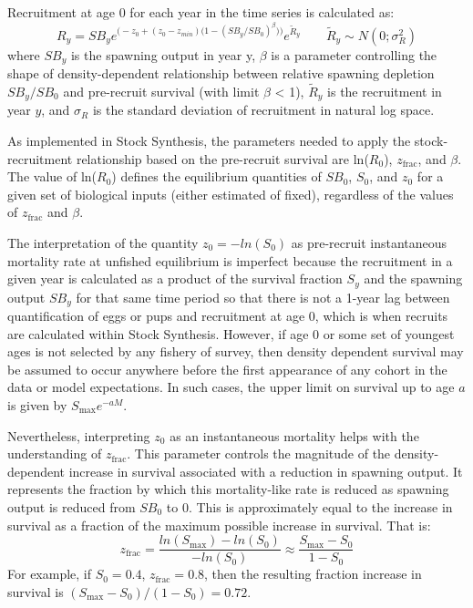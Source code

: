 Recruitment at age 0 for each year in the time series is calculated as:
\begin{equation}{ R_y = SB_ye^{\Big(-z_0 + (z_0-z_{min})\big(1-(SB_y/SB_0)^\beta \big)\Big)}e^{\tilde{R}_y}\qquad  \tilde{R}_y\sim N(0;\sigma^2_R)}
\end{equation}
where $SB_y$ is the spawning output in year y, $\beta$ is a parameter controlling the shape of density-dependent relationship between relative spawning depletion $SB_y/SB_0$ and pre-recruit survival (with limit $\beta$ < 1), $\tilde{R}_y$ is the recruitment in year $y$, and $\sigma_R$ is the standard deviation of recruitment in natural log space. 

As implemented in Stock Synthesis, the parameters needed to apply the stock-recruitment relationship based on the pre-recruit survival are ln($R_0$), $z_{\text{frac}}$, and $\beta$. The value of ln($R_0$) defines the equilibrium quantities of $SB_0$, $S_0$, and $z_0$ for a given set of biological inputs (either estimated of fixed), regardless of the values of $z_{\text{frac}}$ and $\beta$.

The interpretation of the quantity $z_0=-ln(S_0)$ as pre-recruit instantaneous mortality rate at unfished equilibrium is imperfect because the recruitment in a given year is calculated as a product of the survival fraction $S_y$ and the spawning output $SB_y$ for that same time period so that there is not a 1-year lag between quantification of eggs or pups and recruitment at age 0, which is when recruits are calculated within Stock Synthesis. However, if age 0 or some set of youngest ages is not selected by any fishery of survey, then density dependent survival may be assumed to occur anywhere before the first appearance of any cohort in the data or model expectations. In such cases, the upper limit on survival up to age $a$ is given by $S_{\text{max}}e^{-aM}$. 

Nevertheless, interpreting $z_0$ as an instantaneous mortality helps with the understanding of $z_{\text{frac}}$. This parameter controls the magnitude of the density-dependent increase in survival associated with a reduction in spawning output. It represents the fraction by which this mortality-like rate is reduced as spawning output is reduced from $SB_0$ to 0. This is approximately equal to the increase in survival as a fraction of the maximum possible increase in survival. That is: 
\begin{equation}
z_{\text{frac}}=\frac{ln(S_{\text{max}})-ln(S_0)}{-ln(S_0)} \approx \frac{S_{\text{max}}-S_0}{1-S_0}
\end{equation}
For example, if $S_0 = 0.4$, $z_{\text{frac}}=0.8$, then the resulting fraction increase in survival is $(S_{\text{max}}-S_0)/(1-S_0)=0.72$.

